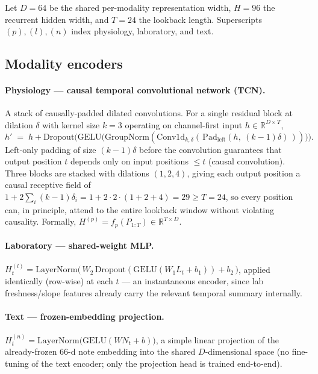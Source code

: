 \documentclass[11pt]{article}
\newcommand{\R}{\mathbb{R}}
\newcommand{\1}[1]{\mathbf{1}\!\left[#1\right]}
\begin{document}
Let $D=64$ be the shared per-modality representation width, $H=96$ the recurrent hidden width, and $T=24$ the lookback length. Superscripts $(p),(l),(n)$ index physiology, laboratory, and text.

\subsection{Modality encoders}

\paragraph{Physiology --- causal temporal convolutional network (TCN).}
A stack of causally-padded dilated convolutions. For a single residual block at dilation $\delta$ with kernel size $k=3$ operating on channel-first input $h\in\R^{D\times T}$,
\begin{equation}
h' \;=\; h + \mathrm{Dropout}\Big(\mathrm{GELU}\big(\mathrm{GroupNorm}(\mathrm{Conv1d}_{k,\delta}(\,\mathrm{Pad}_{\mathrm{left}}(h,\ (k-1)\delta)\,))\big)\Big).
\end{equation}
Left-only padding of size $(k-1)\delta$ before the convolution guarantees that output position $t$ depends only on input positions $\le t$ (causal convolution). Three blocks are stacked with dilations $(1,2,4)$, giving each output position a causal receptive field of $1+2\sum_i (k-1)\delta_i = 1+2\cdot2\cdot(1+2+4)=29 \ge T=24$, so every position can, in principle, attend to the entire lookback window without violating causality. Formally, $H^{(p)} = f_p(P_{1:T}) \in \R^{T\times D}$.

\paragraph{Laboratory --- shared-weight MLP.}
$H^{(l)}_t = \mathrm{LayerNorm}\big(\,W_2\,\mathrm{Dropout}(\mathrm{GELU}(W_1 L_t + b_1)) + b_2\,\big)$, applied identically (row-wise) at each $t$ — an instantaneous encoder, since lab freshness/slope features already carry the relevant temporal summary internally.

\paragraph{Text --- frozen-embedding projection.}
$H^{(n)}_t = \mathrm{LayerNorm}\big(\mathrm{GELU}(W N_t + b)\big)$, a simple linear projection of the already-frozen $66$-d note embedding into the shared $D$-dimensional space (no fine-tuning of the text encoder; only the projection head is trained end-to-end).
\end{document}
